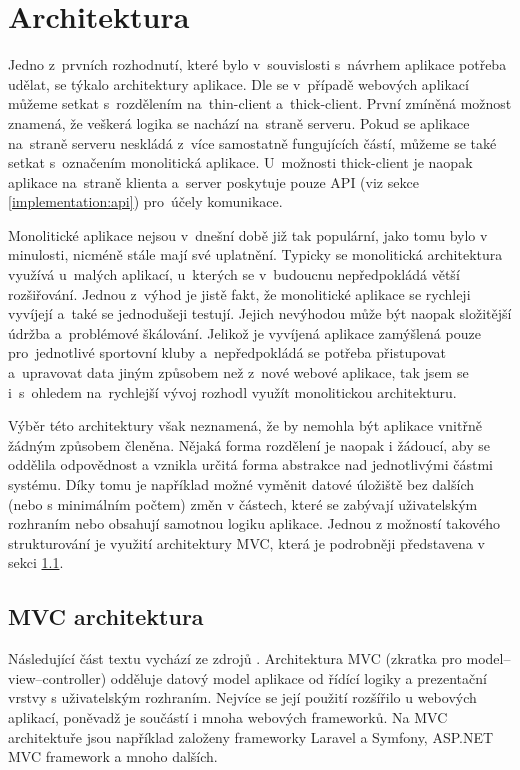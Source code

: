 \section{Architektura}
Jedno z~prvních rozhodnutí, které bylo v~souvislosti s~návrhem aplikace potřeba udělat, se týkalo architektury aplikace. Dle \cite{twa_architecture} se v~případě webových aplikací můžeme setkat s~rozdělením na~thin-client a~thick-client. První zmíněná možnost znamená, že veškerá logika se nachází na~straně serveru. Pokud se aplikace na~straně serveru neskládá z~více samostatně fungujících částí, můžeme se také setkat s~označením monolitická aplikace. U~možnosti thick-client je naopak aplikace na~straně klienta a~server poskytuje pouze API (viz sekce \ref{implementation:api}) pro~účely komunikace.

Monolitické aplikace nejsou v~dnešní době již tak populární, jako tomu bylo v minulosti, nicméně stále mají své uplatnění. Typicky se monolitická architektura využívá u~malých aplikací, u~kterých se v~budoucnu nepředpokládá větší rozšiřování. Jednou z~výhod je jistě fakt, že monolitické aplikace se rychleji vyvíjejí a~také se jednodušeji testují. Jejich nevýhodou může být naopak složitější údržba a~problémové škálování. \cite{twa_architecture, monolithic_architecture} Jelikož je vyvíjená aplikace zamýšlená pouze pro~jednotlivé sportovní kluby a~nepředpokládá se potřeba přistupovat a~upravovat data jiným způsobem než z~nové webové aplikace, tak jsem se i~s~ohledem na~rychlejší vývoj rozhodl využít monolitickou architekturu.

Výběr této architektury však neznamená, že by nemohla být aplikace vnitřně žádným způsobem členěna. Nějaká forma rozdělení je naopak i žádoucí, aby se oddělila odpovědnost a vznikla určitá forma abstrakce nad jednotlivými částmi systému. Díky tomu je například možné vyměnit datové úložiště bez dalších (nebo s minimálním počtem) změn v částech, které se zabývají uživatelským rozhraním nebo obsahují samotnou logiku aplikace. Jednou z možností takového strukturování je využití architektury MVC, která je podrobněji představena v sekci \ref{section:mvc}.

\subsection{MVC architektura}\label{section:mvc}
Následující část textu vychází ze zdrojů \cite{it_network_mvc, mdn_mvc}. Architektura MVC (zkratka pro model–view–controller) odděluje datový model aplikace od řídící logiky a prezentační vrstvy s uživatelským rozhraním. Nejvíce se její použití rozšířilo u webových aplikací, poněvadž je součástí i mnoha webových frameworků. Na MVC architektuře jsou například založeny frameworky Laravel a Symfony, ASP.NET MVC framework a mnoho dalších.

